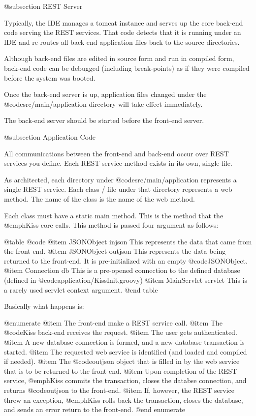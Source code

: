 @subsection REST Server

Typically, the IDE manages a tomcat instance and serves up the core
back-end code serving the REST services.  That code detects that it is
running under an IDE and re-routes all back-end application files back
to the source directories.

Although back-end files are edited in source form and run in compiled
form, back-end code can be debugged (including break-points) as if
they were compiled before the system was booted.

Once the back-end server is up, application files changed under the
@code{src/main/application} directory will take effect immediately.

The back-end server should be started before the front-end server.

@subsection Application Code

All communications between the front-end and back-end occur over REST
services you define.  Each REST service method exists in its own, single
file.

As architected, each directory under @code{src/main/application}
represents a single REST service.  Each class / file under that
directory represents a web method.  The name of the class is the name
of the web method.

Each class must have a static main method.  This is the method that
the @emph{Kiss} core calls.  This method is passed four argument as
follows:

@table @code
@item JSONObject injson
This represents the data that came from the front-end.
@item JSONObject outjson
This represents the data being returned to the front-end.  It is pre-initialized with an empty @code{JSONObject}.
@item Connection db
This is a pre-opened connection to the defined database (defined in @code{application/KissInit.groovy})
@item MainServlet servlet
This is a rarely used servlet context argument.
@end table

Basically what happens is:

@enumerate
@item
The front-end make a REST service call.
@item
The @code{Kiss} back-end receives the request.
@item
The user gets authenticated.
@item
A new database connection is formed, and a new database transaction is started.
@item
The requested web service is identified (and loaded and compiled if needed).
@item
The @code{outjson} object that is filled in by the web service that is to be returned to the front-end.
@item
Upon completion of the REST service, @emph{Kiss} commits the transaction, closes the databse connection, and returns @code{outjson} to the front-end.
@item
If, however, the REST service threw an exception, @emph{Kiss} rolls back the transaction, closes the database, and sends an error return to the front-end.
@end enumerate

